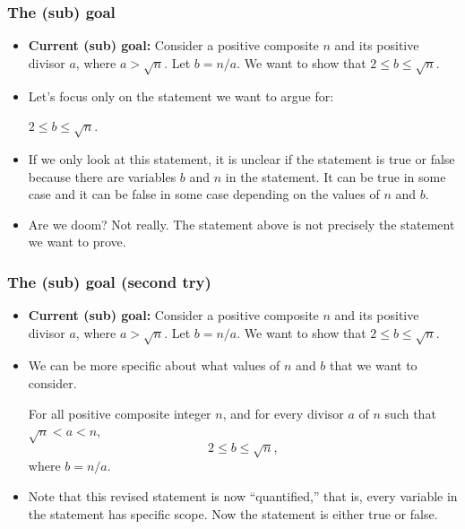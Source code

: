 \begin{frame}\frametitle{The (sub) goal}
  \begin{itemize}
  \item
    {\bf Current (sub) goal:} Consider a positive composite $n$ and its
    positive divisor $a$, where $a>\sqrt{n}$.  Let $b=n/a$.  We want
    to show that $2\leq b\leq\sqrt{n}$.
    \pause
  \item Let's focus only on the statement we want to argue for:
    \pause

    \begin{tcolorbox}
      \begin{center}
        $2\leq b\leq\sqrt{n}$.
      \end{center}
    \end{tcolorbox}
    
    \pause
  \item If we only look at this statement, it is unclear if the
    statement is true or false because there are variables $b$ and $n$
    in the statement.  It can be true in some case and it can be false
    in some case depending on the values of $n$ and $b$.

    \pause

  \item Are we doom? \pause Not really.  The statement above is not
    precisely the statement we want to prove.
  \end{itemize}
\end{frame}

\begin{frame}\frametitle{The (sub) goal (second try)}
  \begin{itemize}
  \item
    {\small {\bf Current (sub) goal:} Consider a positive composite $n$ and its
    positive divisor $a$, where $a>\sqrt{n}$.  Let $b=n/a$.  We want
    to show that $2\leq b\leq\sqrt{n}$.}

  \item We can be more specific about what values of $n$ and $b$ that
    we want to consider. \pause

    \begin{tcolorbox}[title=Revised statement]
      For all positive composite integer $n$, and for every divisor
      $a$ of $n$ such that $\sqrt{n} < a < n$,
      \[ 2\leq b\leq\sqrt{n},\]
      where $b=n/a$.
    \end{tcolorbox}

  \item Note that this revised statement is now ``quantified,'' that
    is, every variable in the statement has specific scope.  Now the
    statement is either true or false.
  \end{itemize}
\end{frame}

